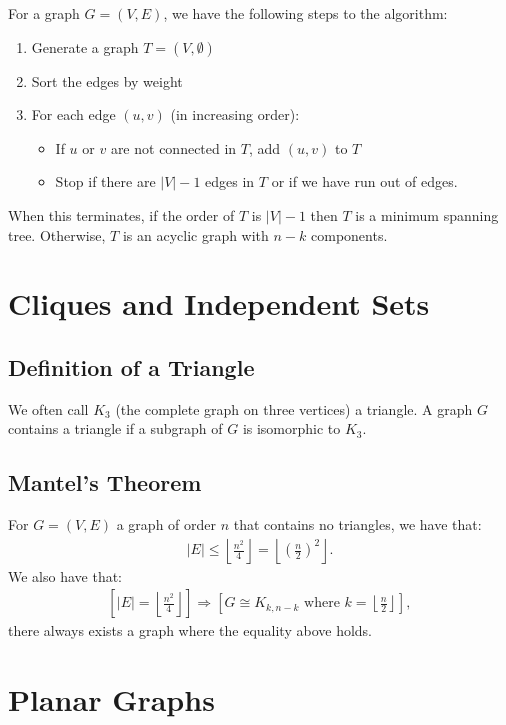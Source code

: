 \documentclass[a4paper, 12pt, twoside]{article}
\begin{document}
For a graph $G = (V, E)$, we have 
the following steps to the algorithm: \begin{enumerate}
  \item Generate a graph $T = (V, \emptyset)$
  \item Sort the edges by weight
  \item For each edge $(u, v)$ (in increasing order): \begin{itemize}
    \item If $u$ or $v$ are not connected in $T$, add $(u, v)$ to $T$
    \item Stop if there are $|V| - 1$ edges in $T$ or if we have run
    out of edges.
  \end{itemize}
\end{enumerate} When this terminates, if the order of $T$ is $|V| - 1$
then $T$ is a minimum spanning tree. Otherwise, $T$ is an acyclic
graph with $n - k$ components.

\section{Cliques and Independent Sets}

\subsection{Definition of a Triangle}

We often call $K_3$ (the complete graph on three vertices) a triangle. A graph $G$
contains a triangle if a subgraph of $G$ is isomorphic to $K_3$.

\subsection{Mantel's Theorem}

For $G = (V, E)$ a graph of order $n$ that contains no triangles, we have that: \begin{gather*}
  |E| \leq \left\lfloor \frac{n^2}{4} \right\rfloor = \left\lfloor \left(\frac{n}{2}\right)^2 \right\rfloor.
\end{gather*} We also have that: \begin{gather*}
  \left[ |E| = \left\lfloor \frac{n^2}{4} \right\rfloor \right]
  \Rightarrow
  \left[ G \cong K_{k, n - k} \text{ where } k = \left\lfloor \frac{n}{2} \right\rfloor \right],
\end{gather*} there always exists a graph where the equality above holds.

\section{Planar Graphs}
\end{document}
